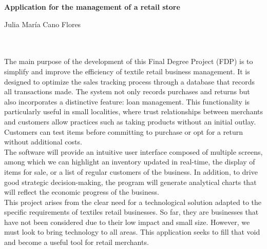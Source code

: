 \cleardoublepage




\begin{center}
{\large\bfseries Application for the management of a retail store}\\
\end{center}
\begin{center}
Julia María Cano Flores\\
\end{center}

\vspace{0.7cm}
\\

\vspace{0.7cm}
\\


The main purpose of the development of this Final Degree Project (FDP) is to simplify and improve the efficiency of textile retail business management. It is designed to optimize the sales tracking process through a database that records all transactions made. The system not only records purchases and returns but also incorporates a distinctive feature: loan management. This functionality is particularly useful in small localities, where trust relationships between merchants and customers allow practices such as taking products without an initial outlay. Customers can test items before committing to purchase or opt for a return without additional costs.\\

The software will provide an intuitive user interface composed of multiple screens, among which we can highlight an inventory updated in real-time, the display of items for sale, or a list of regular customers of the business. In addition, to drive good strategic decision-making, the program will generate analytical charts that will reflect the economic progress of the business.\\

This project arises from the clear need for a technological solution adapted to the specific requirements of textiles retail businesses. So far, they are businesses that have not been considered due to their low impact and small size. However, we must look to bring technology to all areas. This application seeks to fill that void and become a useful tool for retail merchants.



